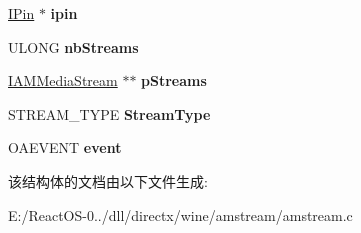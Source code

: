 \begin{DoxyCompactItemize}
\hyperlink{interface_i_pin}{I\+Pin} $\ast$ {\bfseries ipin}
\item 
\mbox{\label{struct_i_a_m_multi_media_stream_impl_a23c5ec761c815e1f77995b043e52e1b1}} 
U\+L\+O\+NG {\bfseries nb\+Streams}
\item 
\mbox{\label{struct_i_a_m_multi_media_stream_impl_a1fb745f153c460cfbc13b7370f75a6f3}} 
\hyperlink{interface_i_a_m_media_stream}{I\+A\+M\+Media\+Stream} $\ast$$\ast$ {\bfseries p\+Streams}
\item 
\mbox{\label{struct_i_a_m_multi_media_stream_impl_a5bcc353531b37492a7003fce32d6ff74}} 
S\+T\+R\+E\+A\+M\+\_\+\+T\+Y\+PE {\bfseries Stream\+Type}
\item 
\mbox{\label{struct_i_a_m_multi_media_stream_impl_a9efbb3fccb67e3503fdf5f08a96602ca}} 
O\+A\+E\+V\+E\+NT {\bfseries event}
\end{DoxyCompactItemize}


该结构体的文档由以下文件生成\+:\begin{DoxyCompactItemize}
\item 
E\+:/\+React\+O\+S-\/0../dll/directx/wine/amstream/amstream.\+c\end{DoxyCompactItemize}
